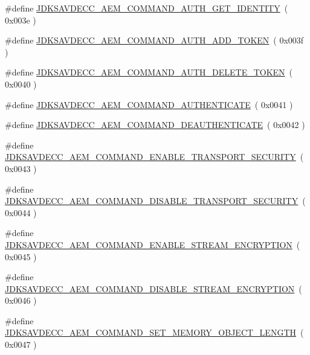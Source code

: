 \begin{DoxyCompactItemize}
\#define \hyperlink{group__command_ga7ac3cb959f9aee53118056a1f00eeeb4}{J\+D\+K\+S\+A\+V\+D\+E\+C\+C\+\_\+\+A\+E\+M\+\_\+\+C\+O\+M\+M\+A\+N\+D\+\_\+\+A\+U\+T\+H\+\_\+\+G\+E\+T\+\_\+\+I\+D\+E\+N\+T\+I\+TY}~( 0x003e )
\item 
\#define \hyperlink{group__command_ga7ddaac97fe7eb5386a74ff1732eeac2d}{J\+D\+K\+S\+A\+V\+D\+E\+C\+C\+\_\+\+A\+E\+M\+\_\+\+C\+O\+M\+M\+A\+N\+D\+\_\+\+A\+U\+T\+H\+\_\+\+A\+D\+D\+\_\+\+T\+O\+K\+EN}~( 0x003f )
\item 
\#define \hyperlink{group__command_gab3e4fbbcbf72034cf17c3bbb7364b16b}{J\+D\+K\+S\+A\+V\+D\+E\+C\+C\+\_\+\+A\+E\+M\+\_\+\+C\+O\+M\+M\+A\+N\+D\+\_\+\+A\+U\+T\+H\+\_\+\+D\+E\+L\+E\+T\+E\+\_\+\+T\+O\+K\+EN}~( 0x0040 )
\item 
\#define \hyperlink{group__command_ga15a1dd639faf0e2977f1fa434acebecc}{J\+D\+K\+S\+A\+V\+D\+E\+C\+C\+\_\+\+A\+E\+M\+\_\+\+C\+O\+M\+M\+A\+N\+D\+\_\+\+A\+U\+T\+H\+E\+N\+T\+I\+C\+A\+TE}~( 0x0041 )
\item 
\#define \hyperlink{group__command_ga672ec7e58864c1b6ca0a7264ba028fba}{J\+D\+K\+S\+A\+V\+D\+E\+C\+C\+\_\+\+A\+E\+M\+\_\+\+C\+O\+M\+M\+A\+N\+D\+\_\+\+D\+E\+A\+U\+T\+H\+E\+N\+T\+I\+C\+A\+TE}~( 0x0042 )
\item 
\#define \hyperlink{group__command_gaac4ad151bf881e5c483c2307aaf5ec99}{J\+D\+K\+S\+A\+V\+D\+E\+C\+C\+\_\+\+A\+E\+M\+\_\+\+C\+O\+M\+M\+A\+N\+D\+\_\+\+E\+N\+A\+B\+L\+E\+\_\+\+T\+R\+A\+N\+S\+P\+O\+R\+T\+\_\+\+S\+E\+C\+U\+R\+I\+TY}~( 0x0043 )
\item 
\#define \hyperlink{group__command_ga90c0c7506e4219bda99fd02c4fa7a9f4}{J\+D\+K\+S\+A\+V\+D\+E\+C\+C\+\_\+\+A\+E\+M\+\_\+\+C\+O\+M\+M\+A\+N\+D\+\_\+\+D\+I\+S\+A\+B\+L\+E\+\_\+\+T\+R\+A\+N\+S\+P\+O\+R\+T\+\_\+\+S\+E\+C\+U\+R\+I\+TY}~( 0x0044 )
\item 
\#define \hyperlink{group__command_ga338f311d32334fb87757ade2bf8abf38}{J\+D\+K\+S\+A\+V\+D\+E\+C\+C\+\_\+\+A\+E\+M\+\_\+\+C\+O\+M\+M\+A\+N\+D\+\_\+\+E\+N\+A\+B\+L\+E\+\_\+\+S\+T\+R\+E\+A\+M\+\_\+\+E\+N\+C\+R\+Y\+P\+T\+I\+ON}~( 0x0045 )
\item 
\#define \hyperlink{group__command_ga8b46b8b76b99b526597c071f91045451}{J\+D\+K\+S\+A\+V\+D\+E\+C\+C\+\_\+\+A\+E\+M\+\_\+\+C\+O\+M\+M\+A\+N\+D\+\_\+\+D\+I\+S\+A\+B\+L\+E\+\_\+\+S\+T\+R\+E\+A\+M\+\_\+\+E\+N\+C\+R\+Y\+P\+T\+I\+ON}~( 0x0046 )
\item 
\#define \hyperlink{group__command_gab698ba472193df8934158997e1fef40b}{J\+D\+K\+S\+A\+V\+D\+E\+C\+C\+\_\+\+A\+E\+M\+\_\+\+C\+O\+M\+M\+A\+N\+D\+\_\+\+S\+E\+T\+\_\+\+M\+E\+M\+O\+R\+Y\+\_\+\+O\+B\+J\+E\+C\+T\+\_\+\+L\+E\+N\+G\+TH}~( 0x0047 )

\end{DoxyCompactItemize}
